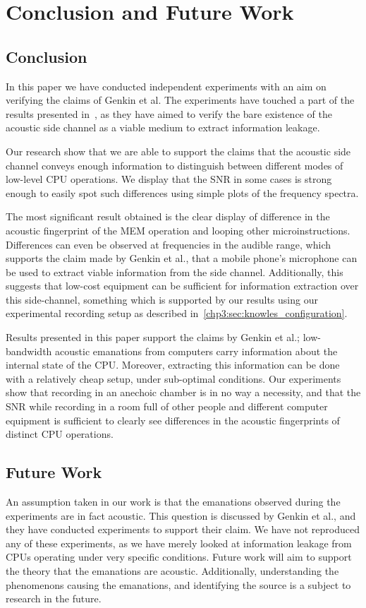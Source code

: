 \chapter{Conclusion and Future Work}\label{chp7:conclusion}

\section{Conclusion}
In this paper we have conducted independent experiments with an aim on verifying the claims of Genkin et al. 
The experiments have touched a part of the results presented in~\cite{DBLP:conf/crypto/GenkinST14}, as they have aimed to verify the bare existence of the acoustic side channel as a viable medium to extract information leakage.

Our research show that we are able to support the claims that the acoustic side channel conveys enough information to distinguish between different modes of low-level CPU operations.
We display that the \gls{SNR} in some cases is strong enough to easily spot such differences using simple plots of the frequency spectra.

The most significant result obtained is the clear display of difference in the acoustic fingerprint of the MEM operation and looping other microinstructions.
Differences can even be observed at frequencies in the audible range, which supports the claim made by Genkin et al., that a mobile phone's microphone can be used to extract viable information from the side channel.
Additionally, this suggests that low-cost equipment can be sufficient for information extraction over this side-channel, something which is supported by our results using our experimental recording setup as described in~\autoref{chp3:sec:knowles_configuration}.

Results presented in this paper support the claims by Genkin et al.; low-bandwidth acoustic emanations from computers carry information about the internal state of the \gls{CPU}.
Moreover, extracting this information can be done with a relatively cheap setup, under sub-optimal conditions.
Our experiments show that recording in an anechoic chamber is in no way a necessity, and that the \gls{SNR} while recording in a room full of other people and different computer equipment is sufficient to clearly see differences in the acoustic fingerprints of distinct \gls{CPU} operations.



\section{Future Work}\label{chp7:sec:future_work}
An assumption taken in our work is that the emanations observed during the experiments are in fact acoustic.
This question is discussed by Genkin et al., and they have conducted experiments to support their claim.
We have not reproduced any of these experiments, as we have merely looked at information leakage from CPUs operating under very specific conditions.
Future work will aim to support the theory that the emanations are acoustic.
Additionally, understanding the phenomenons causing the emanations, and identifying the source is a subject to research in the future.




